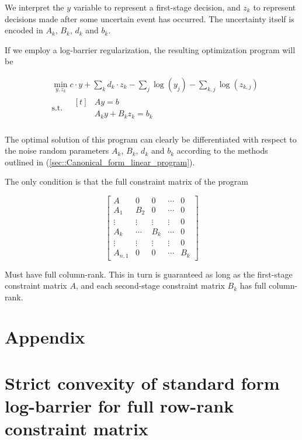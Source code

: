 \documentclass[12pt]{article}
\newcommand{\dotprod}[2]{#1\mathbin{\cdot}#2}
\newcommand{\matmul}[2]{#1 #2}
\newcommand{\st}{\text{s.t.}}
\begin{document}
We interpret the $y$ variable to represent a first-stage decision, and $z_k$ to represent
decisions made after some uncertain event has occurred.
The uncertainty itself is encoded in $A_k$, $B_k$, $d_k$ and $b_k$.

If we employ a log-barrier regularization, the resulting optimization program
will be

\begin{align}
    \label{prob::Two_stage_linear_extensive_form}
    & \min_{y, z_k}  \dotprod{c}{y} + \sum_k \dotprod{d_k}{z_k} - \sum_j \log(y_j) - \sum_{k,j} \log(z_{k,j}) \\
    & \st \quad  \begin{aligned}[t] 
        & \matmul{A}{y} = b \\
        & \matmul{A_k}{y} + \matmul{B_k}{z_k} = b_k
    \end{aligned}\\
\end{align}

The optimal solution of this program can clearly be differentiated with respect to the noise
random parameters $A_k$, $B_k$, $d_k$ and $b_k$ according to the methods outlined 
in (\ref{sec::Canonical_form_linear_program}).

The only condition is that the full constraint matrix of the program

\[
\begin{bmatrix}
A & 0 & 0 & \cdots & 0 \\
A_{1} & B_{2} & 0 & \cdots & 0 \\
\vdots  & \vdots  & \vdots & \vdots & 0 \\
A_{k} & \cdots & B_{k} & \cdots & 0 \\
\vdots  & \vdots  & \vdots & \vdots & 0 \\
A_{n,1} & 0 & 0 & \cdots & B_{k}
\end{bmatrix}
\]

Must have full column-rank. This in turn is guaranteed as long as the  
first-stage constraint matrix $A$, and each second-stage constraint 
matrix  $B_k$ has full column-rank.




\appendix
\section*{Appendix}

\section{Strict convexity of standard form log-barrier for full row-rank constraint matrix}
\end{document}

